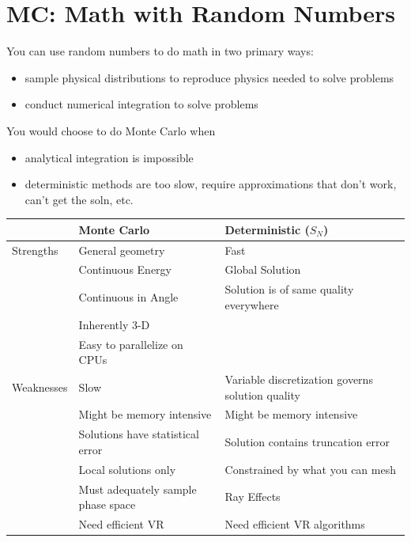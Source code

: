 \documentclass[12pt]{article}
\begin{document}
\clearpage
\section{MC: Math with Random Numbers}

You can use random numbers to do math in two primary ways: 
\begin{itemize}
\item sample physical distributions to reproduce physics needed to solve  problems
\item conduct numerical integration to solve problems
\end{itemize}

You would choose to do Monte Carlo when 
\begin{itemize}
\item analytical integration is impossible
\item deterministic methods are too slow, require approximations that don't work, can't get the soln, etc.
\end{itemize} 

\begin{center}
\begin{tabu}{| l | X | X |}
  \hline
  & Monte Carlo         & Deterministic ($S_N$) \\\hline
    Strengths & General geometry    & Fast \\
              & Continuous Energy   & Global Solution\\
              & Continuous in Angle & Solution is of same quality everywhere\\
              & Inherently 3-D      & \\
              & Easy to parallelize on CPUs & \\\hline
    Weaknesses & Slow & Variable discretization governs solution quality \\
               & Might be memory intensive & Might be memory intensive \\
               & Solutions have statistical error & Solution contains truncation error\\
               & Local solutions only & Constrained by what you can mesh \\
               & Must adequately sample phase space & Ray Effects \\
               & Need efficient VR & Need efficient VR algorithms \\\hline
  \end{tabu}
\end{center}
\end{document}
